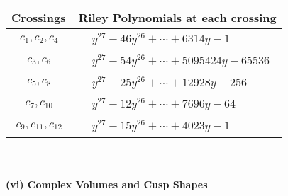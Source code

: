 \documentclass[1p]{elsarticle_modified}
\theoremstyle{definition}
\begin{document}
\begin{tabular}{m{50pt}|m{274pt}}
Crossings & \hspace{64pt}Riley Polynomials at each crossing \\
\hline $$\begin{aligned}c_{1},c_{2},c_{4}\end{aligned}$$&$\begin{aligned}
&y^{27}-46 y^{26}+\cdots+6314 y-1
\end{aligned}$\\
\hline $$\begin{aligned}c_{3},c_{6}\end{aligned}$$&$\begin{aligned}
&y^{27}-54 y^{26}+\cdots+5095424 y-65536
\end{aligned}$\\
\hline $$\begin{aligned}c_{5},c_{8}\end{aligned}$$&$\begin{aligned}
&y^{27}+25 y^{26}+\cdots+12928 y-256
\end{aligned}$\\
\hline $$\begin{aligned}c_{7},c_{10}\end{aligned}$$&$\begin{aligned}
&y^{27}+12 y^{26}+\cdots+7696 y-64
\end{aligned}$\\
\hline $$\begin{aligned}c_{9},c_{11},c_{12}\end{aligned}$$&$\begin{aligned}
&y^{27}-15 y^{26}+\cdots+4023 y-1
\end{aligned}$\\
\hline
\end{tabular}\\~\\
\newpage\flushleft \textbf{(vi) Complex Volumes and Cusp Shapes}
\end{document}
